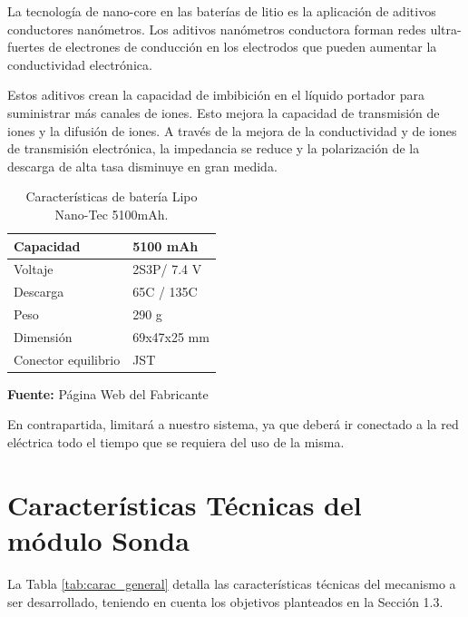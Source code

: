 La tecnolog\'ia de nano-core en las bater\'ias de litio es la aplicaci\'on de aditivos conductores nan\'ometros. Los aditivos nan\'ometros conductora forman redes ultra-fuertes de electrones de conducci\'on en los electrodos que pueden aumentar la conductividad electr\'onica.

Estos aditivos crean la capacidad de imbibici\'on en el l\'iquido portador para suministrar m\'as canales de iones. Esto mejora la capacidad de transmisi\'on de iones y la difusi\'on de iones. A trav\'es de la mejora de la conductividad y de iones de transmisi\'on electr\'onica, la impedancia se reduce y la polarizaci\'on de la descarga de alta tasa disminuye en gran medida.

\hfill
\begin{table}[t]
\protect\caption[Caracter\'isticas de bater\'ia Lipo Nano-Tech ]{Caracter\'isticas de bater\'ia Lipo Nano-Tec 5100mAh.}
\label{tab:caract_bat}
\begin{center}
\begin{tabular}{|l|l|}
\hline
Capacidad    &  5100 mAh \\
\hline
Voltaje      &  2S3P/ 7.4 V \\
\hline
Descarga &  65C / 135C \\
\hline
Peso  & 290 g\\
\hline
Dimensi\'on   &  69x47x25 mm\\
\hline
Conector equilibrio	& JST\\
\hline
\end{tabular}
\vspace{5mm}
\newline
\hfill \textbf{Fuente:} P\'agina Web del Fabricante\cite{bateria}
\end{center}
\end{table}

En contrapartida, limitará a nuestro sistema, ya que deberá ir conectado a la red eléctrica todo el tiempo que se requiera del uso de la misma.
\section[Características Técnicas de los módulos]{Características Técnicas del módulo Sonda}
La Tabla \ref{tab:carac_general} detalla las características técnicas del mecanismo a ser desarrollado, teniendo en cuenta los objetivos planteados en la Sección 1.3.

